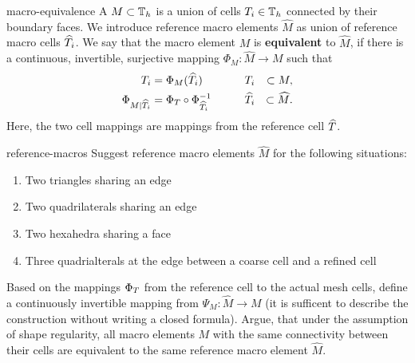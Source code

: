 \begin{Definition}{macro-equivalence}
  A  $M\subset \mathbb T_h$ is a union of cells
  $T_i\in\mathbb T_h$ connected by their boundary faces. We introduce
  reference macro elements $\widehat M$ as union of reference macro
  cells $\widehat {T}_i$. We say that the macro element $M$ is
  \textbf{equivalent}
  to $\widehat M$, if there is a continuous, invertible,
  surjective mapping $\Phi_M\colon \widehat M\to M$ such that
  \begin{gather}
    \begin{aligned}
      T_i &= \Phi_M(\widehat{T}_i)
      &\qquad&T_i&\subset M,\\
      \Phi_{M|\widehat{T}_i} &= \Phi_T \circ \Phi^{-1}_{\widehat{T}_i}
      &\qquad&\widehat{T}_i&\subset \widehat M.\\
    \end{aligned}
  \end{gather}
  Here, the two cell mappings are mappings from the reference cell
  $\widehat{T}$.
%
\end{Definition}

\begin{Problem}{reference-macros}
  Suggest reference macro elements $\widehat M$ for the following
  situations:
  \begin{enumerate}
  \item Two triangles sharing an edge
  \item Two quadrilaterals sharing an edge
  \item Two hexahedra sharing a face
  \item Three quadrialterals at the edge between a coarse cell and a
    refined cell
  \end{enumerate}
  Based on the mappings $\Phi_T$ from the reference cell to the
  actual mesh cells, define a continuously invertible mapping from
  $\Psi_M:\widehat M \to M$ (it is sufficent to describe the
  construction without writing a closed formula). Argue, that under the
  assumption of shape regularity, all macro elements $M$ with the same
  connectivity between their cells are equivalent to the same
  reference macro element $\widehat M$.
\end{Problem}


